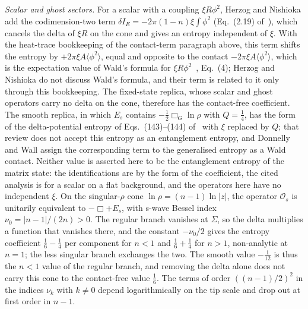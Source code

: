 \emph{Scalar and ghost sectors.} For a scalar with a coupling \(\xi R\phi^2\), Herzog and Nishioka add the codimension-two term \(\delta I_E=-2\pi(1-n)\xi\int\phi^2\) (Eq.~(2.19) of~\cite{HerzogNishioka2016}), which cancels the delta of \(\xi R\) on the cone and gives an entropy independent of \(\xi\). With the heat-trace bookkeeping of the contact-term paragraph above, this term shifts the entropy by \(+2\pi\xi A\langle\phi^2\rangle\), equal and opposite to the contact \(-2\pi\xi A\langle\phi^2\rangle\), which is the expectation value of Wald's formula for \(\xi R\phi^2\)~\cite{DonnellyWall2016}, Eq.~(4); Herzog and Nishioka do not discuss Wald's formula, and their term is related to it only through this bookkeeping. The fixed-state replica, whose scalar and ghost operators carry no delta on the cone, therefore has the contact-free coefficient. The smooth replica, in which \(E_s\) contains \(-\tfrac12\Box_G\ln\rho\) with \(Q=\tfrac14\), has the form of the delta-potential entropy of Eqs.~(143)--(144) of~\cite{Solodukhin2011} with \(\xi\) replaced by \(Q\); that review does not accept this entropy as an entanglement entropy, and Donnelly and Wall assign the corresponding term to the generalised entropy as a Wald contact. Neither value is asserted here to be the entanglement entropy of the matrix state: the identifications are by the form of the coefficient, the cited analysis is for a scalar on a flat background, and the operators here have no independent \(\xi\). On the singular-\(\rho\) cone \(\ln\rho=(n-1)\ln|z|\), the operator \(\mathcal O_s\) is unitarily equivalent to \(-\Box+E_s\), with s-wave Bessel index \(\nu_0=|n-1|/(2n)>0\). The regular branch vanishes at \(\Sigma\), so the delta multiplies a function that vanishes there, and the constant \(-\nu_0/2\) gives the entropy coefficient \(\tfrac16-\tfrac14\) per component for \(n<1\) and \(\tfrac16+\tfrac14\) for \(n>1\), non-analytic at \(n=1\); the less singular branch exchanges the two. The smooth value \(-\tfrac1{12}\) is thus the \(n<1\) value of the regular branch, and removing the delta alone does not carry this cone to the contact-free value \(\tfrac16\). The terms of order \(((n-1)/2)^2\) in the indices \(\nu_k\) with \(k\neq0\) depend logarithmically on the tip scale and drop out at first order in \(n-1\).



